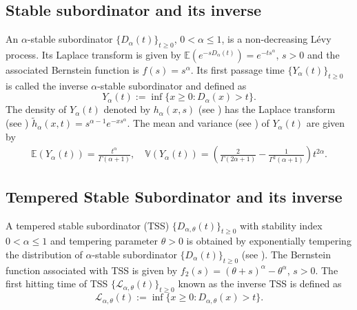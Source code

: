 \documentclass[11pt,oneside,reqno]{amsart}
\theoremstyle{definition}
\theoremstyle{remarkstyle}
\begin{document}
\subsection{Stable subordinator and its inverse}\label{stable subordinator} An $\alpha$-stable subordinator $\{D_{\alpha}(t)\}_{t\geq 0}$, $0<\alpha\le 1$, is a non-decreasing L\'{e}vy process. Its Laplace transform is given by $\mathbb{E}(e^{-sD_\alpha(t)})=e^{-ts^\alpha}$, $s>0$ and the associated Bernstein function is $f(s)=s^\alpha$. Its first passage time $\{Y_\alpha(t)\}_{t\geq 0}$ is called the inverse $\alpha$-stable subordinator and defined as  
\begin{equation*}
Y_\alpha(t):=\inf\{x\geq 0:D_{\alpha}(x)>t \}.
\end{equation*}
The density of $Y_\alpha(t)$ denoted by $h_\alpha(x,s)$ (see \citet{Meerschaert2011}) has the Laplace transform (see \citet{Meerschaert2013}) $\tilde{h}_\alpha(x,t)=s^{\alpha-1}e^{-xs^{\alpha}}.$
The mean and variance (see \citet{Leonenko2014}) of $Y_\alpha(t)$ are given by
\begin{align*}
\mathbb{E}(Y_{\alpha}(t))=\frac{t^\alpha}{\Gamma(\alpha+1)}, \quad
\mathbb{V}(Y_\alpha(t))=(\frac{2}{\Gamma(2\alpha+1)}-\frac{1}{\Gamma^2(\alpha+1)})t^{2\alpha}.
\end{align*}

\subsection{Tempered Stable Subordinator and its inverse}\label{TSS}
A tempered stable subordinator (TSS) $\{D_{\alpha,\theta}(t)\}_{t\ge 0}$ with stability index $0<\alpha\le 1$ and tempering parameter $\theta>0$ is obtained by exponentially tempering the distribution of $\alpha$-stable subordinator $\{D_\alpha(t)\}_{t\ge 0}$ (see \citet{Rosinski2007}). The Bernstein function associated with TSS is given by $f_2(s)=(\theta+s)^\alpha-\theta^\alpha$, $s>0$. The first hitting time of TSS $\{\mathcal{L}_{\alpha,\theta}(t)\}_{t\ge 0}$ known as the inverse TSS is defined as
\begin{equation*}
    \mathcal{L}_{\alpha,\theta}(t):=\inf\{x\ge 0: D_{\alpha,\theta}(x)>t\}.
\end{equation*}
\end{document}

